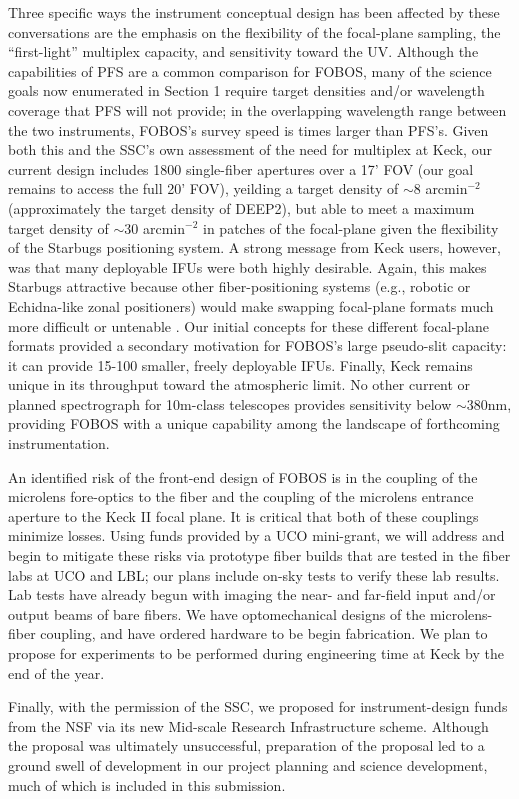 Three specific ways the instrument conceptual design has been
affected by these conversations are the emphasis on the flexibility
of the focal-plane sampling, the ``first-light'' multiplex capacity,
and sensitivity toward the UV. Although the capabilities of PFS are a
common comparison for FOBOS, many of the science goals now enumerated
in Section 1 require target densities and/or wavelength coverage that
PFS will not provide; in the overlapping wavelength range between the
two instruments, FOBOS's survey speed is  times larger
than PFS's. Given both this and the SSC's own assessment of the need
for multiplex at Keck, our current design includes 1800 single-fiber
apertures over a 17' FOV (our goal remains to access the full 20'
FOV), yeilding a target density of $\sim$8 arcmin$^{-2}$
(approximately the target density of DEEP2), but able to meet a
maximum target density of $\sim$30 arcmin$^{-2}$ in patches of the
focal-plane given the flexibility of the Starbugs positioning system.
A strong message from Keck users, however, was that many deployable
IFUs were both highly desirable. Again, this makes Starbugs
attractive because other fiber-positioning systems (e.g., robotic or
Echidna-like zonal positioners) would make swapping focal-plane
formats much more difficult or untenable . Our
initial concepts for these different focal-plane formats provided a
secondary motivation for FOBOS's large pseudo-slit capacity: it can
provide 15-100 smaller, freely deployable IFUs. Finally, Keck
remains unique in its throughput toward the atmospheric limit. No
other current or planned  spectrograph for
10m-class telescopes provides sensitivity below $\sim$380nm,
providing FOBOS with a unique capability among the landscape of
forthcoming instrumentation.



An identified risk of the front-end design of FOBOS is in the
coupling of the microlens fore-optics to the fiber and the coupling
of the microlens entrance aperture to the Keck II focal plane. It is
critical that both of these couplings minimize losses. Using funds
provided by a UCO mini-grant, we will address and begin to mitigate
these risks via prototype fiber builds that are tested in the fiber
labs at UCO and LBL; our plans include on-sky tests to verify these
lab results. Lab tests have already begun with imaging the near- and
far-field input and/or output beams of bare fibers. We have
optomechanical designs of the microlens-fiber coupling, and have
ordered hardware to be begin fabrication. We plan to propose for
experiments to be performed during engineering time at Keck by the
end of the year.

Finally, with the permission of the SSC, we proposed for
instrument-design funds from the NSF via its new Mid-scale Research
Infrastructure scheme. Although the proposal was ultimately
unsuccessful, preparation of the proposal led to a ground swell of
development in our project planning and science development, much of
which is included in this submission.
